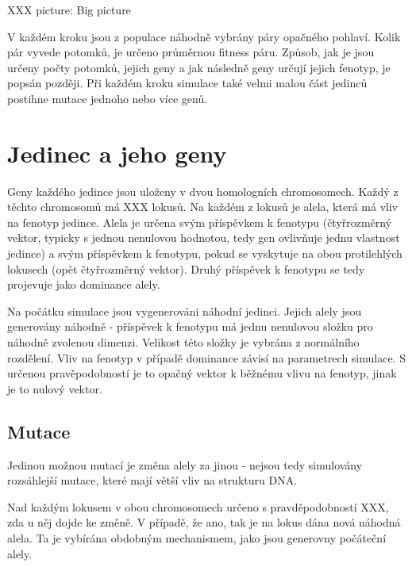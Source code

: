 XXX picture: Big picture



V každém kroku jsou z populace náhodně vybrány páry opačného pohlaví.
Kolik pár vyvede potomků, je určeno průměrnou fitness páru. Způsob, jak je jsou určeny počty potomků, jejich geny a
jak následně geny určují jejich fenotyp, je popsán později.
Při každém kroku simulace také velmi malou část jedinců postihne mutace jednoho nebo více genů.

\section{Jedinec a jeho geny}

Geny každého jedince jsou uloženy v dvou homologních chromosomech. Každý z těchto chromosomů má XXX lokusů.
Na každém z lokusů je alela, která má vliv na fenotyp jedince. Alela je určena svým příspěvkem k fenotypu (čtyřrozměrný
vektor, typicky s jednou nenulovou hodnotou, tedy gen ovlivňuje jednu vlastnost jedince) a svým příspěvkem k fenotypu,
pokud se vyskytuje na obou protilehlých lokusech (opět čtyřrozměrný vektor).
Druhý příspěvek k fenotypu se tedy projevuje jako dominance alely.

Na počátku simulace jsou vygenerováni náhodní jedinci. Jejich alely jsou generovány náhodně - příspěvek k fenotypu
má jednu nenulovou složku pro náhodně zvolenou dimenzi. Velikost této složky je vybrána z normálního rozdělení. Vliv na
fenotyp v případě dominance závisí na parametrech simulace. S určenou pravěpodobností je to opačný vektor k běžnému
vlivu na fenotyp, jinak je to nulový vektor.

\subsection{Mutace}

Jedinou možnou mutací je změna alely za jinou - nejsou tedy simulovány rozsáhlejší mutace, které mají větší vliv na
strukturu DNA.

Nad každým lokusem v obou chromosomech určeno s pravděpodobností XXX, zda u něj dojde ke změně.
V případě, že ano, tak je na lokus dána nová náhodná alela. Ta je vybírána obdobným mechanismem, jako jsou
generovny počáteční alely.


